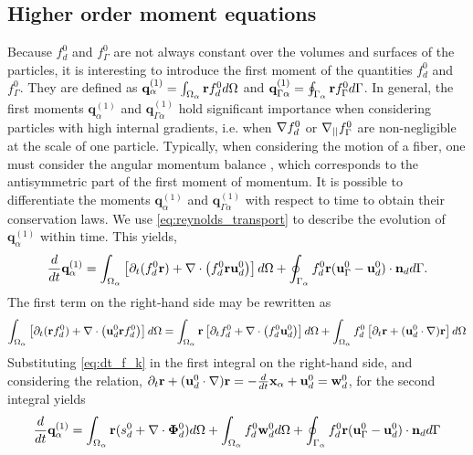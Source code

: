 \documentclass[11pt]{My_preprint}
\begin{document}
\subsection{Higher order moment equations}


Because $f_d^0$ and $f_\Gamma^0$ are not always constant over the volumes and surfaces of the particles, it is interesting to introduce the first moment of the quantities $f_d^0$ and $f_\Gamma^0$. 
They are defined as $\textbf{q}_\alpha^{(1)}     = \int_{\Omega_{\alpha}}  \textbf{r} f_d^0  d\Omega$ and $\textbf{q}_{\Gamma\alpha}^{(1)}    = \oint_{\Gamma_{\alpha}}  \textbf{r} f_\Gamma^0  d\Gamma$.  
In general, the first moments $\textbf{q}^{(1)}_{\alpha}$ and $\textbf{q}^{(1)}_{\Gamma\alpha}$ hold significant importance when considering particles with high internal gradients, i.e. when $\mathbf{\nabla} f_d^0$ or $\mathbf{\nabla}_{||} f_\Gamma^0$ are non-negligible at the scale of one particle. 
Typically, when considering the motion of a fiber, one must consider the angular momentum balance \citep{guazzelli2011}, which corresponds to the antisymmetric part of the first moment of momentum.
It is possible to differentiate the moments $\textbf{q}^{(1)}_\alpha$ and $\textbf{q}^{(1)}_{\Gamma\alpha}$  with respect to time to obtain their conservation laws.
We use \ref{eq:reynolds_transport} to describe the evolution of $\textbf{q}^{(1)}_\alpha$ within time. This yields, 
\begin{equation}
    \frac{d}{dt} \textbf{q}^{(1)}_\alpha
      =  \int_{\Omega_{\alpha}} \left[
        \partial_t(  f_d^0\textbf{r})
        + \mathbf{\nabla}\cdot \left(  f_d^0 \textbf{r}\textbf{u}_d^0\right)
    \right] d\Omega 
    + \oint_{\Gamma_{\alpha}}   f_d^0 \textbf{r}  (\textbf{u}_\Gamma^0-\textbf{u}_d^0)\cdot \textbf{n}_d d\Gamma.
\end{equation}
The first term on the right-hand side may be rewritten as
\begin{equation}
\int_{\Omega_{\alpha}}  \left[
        \partial_t(\textbf{r}  f_d^0)+ \mathbf{\nabla}\cdot \left( \textbf{u}_d^0 \textbf{r} f^0_d\right) 
    \right] d\Omega
    = \int_{\Omega_{\alpha}} \textbf{r}\left[
        \partial_t f_d^0
        + \mathbf{\nabla}\cdot \left(f_d^0 \textbf{u}_d^0\right)
    \right]  d\Omega
    + \int_{\Omega_{\alpha}}  f_d^0 \left[
        \partial_t \textbf{r}
        +(\textbf{u}_d^0 \cdot \mathbf{\nabla}) \textbf{r}
    \right] d\Omega
\end{equation}
Substituting \ref{eq:dt_f_k} in the first integral on the right-hand side, and considering the relation,
$  \partial_t \textbf{r}
+ (\textbf{u}_d^0 \cdot \mathbf{\nabla}) \textbf{r}
= - \frac{d}{dt} \textbf{x}_\alpha  + \textbf{u}_d^0 
= \textbf{w}_d^0$,
for the second integral yields 
\begin{align}
    \frac{d}{dt} \textbf{q}^{(1)}_\alpha = \int_{\Omega_{\alpha}} \textbf{r} (s_d^0 +\mathbf{\nabla}\cdot \bm\Phi_d^0)   d\Omega
    + \int_{\Omega_{\alpha}}  f_d^0\textbf{w}_d^0  d\Omega  + \oint_{\Gamma_{\alpha}}   f_d^0 \textbf{r}  (\textbf{u}_\Gamma^0-\textbf{u}_d^0)\cdot \textbf{n}_d d\Gamma
\end{align}
\end{document}
